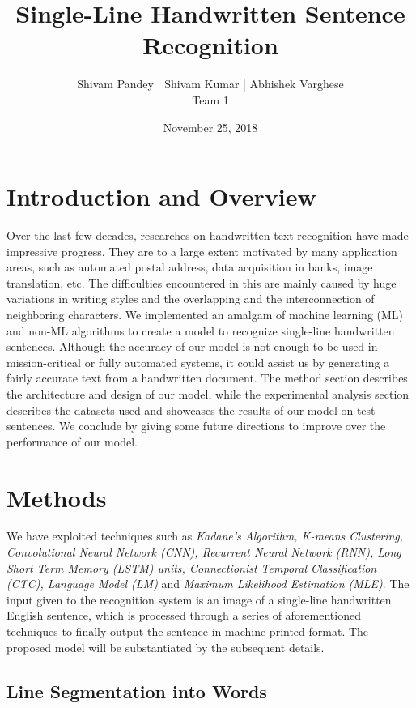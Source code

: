 \documentclass[a4paper, 10pt,twocolumn]{article}
\begin{document}
\title{Single-Line Handwritten Sentence Recognition}
\author{Shivam Pandey | Shivam Kumar | Abhishek Varghese\\Team 1}
\date{November 25, 2018}

\maketitle



\section{Introduction and Overview}
Over the last few decades, researches on handwritten text recognition have made impressive progress. They are to a large extent motivated by many application areas, such as automated postal address, data acquisition in banks, image translation, etc. The difficulties encountered in this are mainly caused by huge variations in writing styles and the overlapping and the interconnection of neighboring characters. We implemented an amalgam of machine learning (ML) and non-ML algorithms to create a model to recognize single-line handwritten sentences. Although the accuracy of our model is not enough to be used in mission-critical or fully automated systems, it could assist us by generating a fairly accurate text from a handwritten document. The method section describes the architecture and design of our model, while the experimental analysis section describes the datasets used and showcases the results of our model on test sentences. We conclude by giving some future directions to improve over the performance of our model.

\section{Methods}
We have exploited techniques such as \emph{Kadane's Algorithm, K-means Clustering, Convolutional Neural Network (CNN), Recurrent Neural Network (RNN), Long Short Term Memory (LSTM) units, Connectionist Temporal Classification (CTC), Language Model (LM)} and \emph{Maximum Likelihood Estimation (MLE)}. The input given to the recognition system is an image of a single-line handwritten English sentence, which is processed through a series of aforementioned techniques to finally output the sentence in machine-printed format. The proposed model will be substantiated by the subsequent details.

\subsection*{Line Segmentation into Words}
\end{document}
